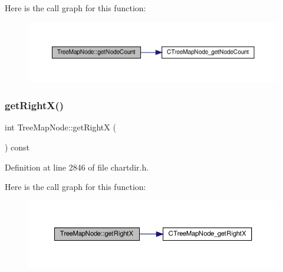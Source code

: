 Here is the call graph for this function\+:
\nopagebreak
\begin{figure}[H]
\begin{center}
\leavevmode
\includegraphics[width=350pt]{class_tree_map_node_a7c32668676377780aa500260f69961c8_cgraph}
\end{center}
\end{figure}
\mbox{\label{class_tree_map_node_ab0d59ca6de7035909efbd92d33a8ea64}} 
\subsubsection{\texorpdfstring{get\+Right\+X()}{getRightX()}}
{\footnotesize\ttfamily int Tree\+Map\+Node\+::get\+RightX (\begin{DoxyParamCaption}{ }\end{DoxyParamCaption}) const\hspace{0.3cm}{\ttfamily [inline]}}



Definition at line 2846 of file chartdir.\+h.

Here is the call graph for this function\+:
\nopagebreak
\begin{figure}[H]
\begin{center}
\leavevmode
\includegraphics[width=350pt]{class_tree_map_node_ab0d59ca6de7035909efbd92d33a8ea64_cgraph}
\end{center}
\end{figure}
\mbox{\label{class_tree_map_node_ad7fbaaab1bbaef5246ba977af6080add}} 
